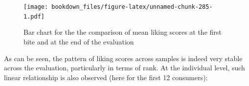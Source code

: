 \documentclass[
]{krantz}
\makeatletter
\newenvironment{Shaded}{\begin{snugshade}}{\end{snugshade}}
\newcommand{\AttributeTok}[1]{\textcolor[rgb]{0.61,0.61,0.61}{#1}}
\newcommand{\ConstantTok}[1]{\textcolor[rgb]{0,0,0}{#1}}
\newcommand{\DecValTok}[1]{\textcolor[rgb]{0.06,0.06,0.06}{#1}}
\newcommand{\FunctionTok}[1]{\textcolor[rgb]{0,0,0}{#1}}
\newcommand{\NormalTok}[1]{#1}
\newcommand{\SpecialCharTok}[1]{\textcolor[rgb]{0,0,0}{#1}}
\newcommand{\StringTok}[1]{\textcolor[rgb]{0.5,0.5,0.5}{#1}}
\newenvironment{kframe}{%
\medskip{}
\setlength{\fboxsep}{.8em}
 \def\at@end@of@kframe{}%
 \ifinner\ifhmode%
  \def\at@end@of@kframe{\end{minipage}}%
  \begin{minipage}{\columnwidth}%
 \fi\fi%
 \def\FrameCommand##1{\hskip\@totalleftmargin \hskip-\fboxsep
 \colorbox{shadecolor}{##1}\hskip-\fboxsep
     \hskip-\linewidth \hskip-\@totalleftmargin \hskip\columnwidth}%
 \MakeFramed {\advance\hsize-\width
   \@totalleftmargin\z@ \linewidth\hsize
   \@setminipage}}%
 {\par\unskip\endMakeFramed%
 \at@end@of@kframe}
\renewenvironment{Shaded}{\begin{kframe}}{\end{kframe}}
\makeatother
\begin{document}
\begin{figure}
\centering
\texttt{[image: bookdown\_files/figure-latex/unnamed-chunk-285-1.pdf]}
\caption{\label{fig:unnamed-chunk-285}Bar chart for the the comparison of mean liking scores at the first bite and at the end of the evaluation}
\end{figure}

As can be seen, the pattern of liking scores across samples is indeed very stable across the evaluation, particularly in terms of rank. At the individual level, such linear relationship is also observed (here for the first 12 consumers):

\begin{Shaded}
\end{Shaded}
\end{document}
